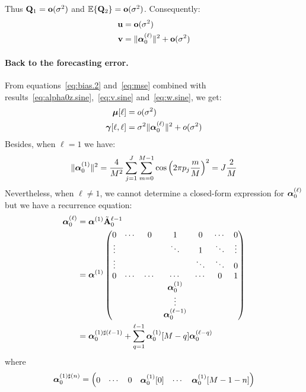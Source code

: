 Thus ${\mathbf Q}_1={\mathbf o}(\sigma^2)$ and ${\mathbb E}\{{\mathbf Q}_2\}={\mathbf o}(\sigma^2)$. Consequently:
\begin{align}
\label{eq:v.sine}
{\mathbf u} &= {\mathbf o}(\sigma^2) \\
\label{eq:w.sine}
{\mathbf v} &= \|\boldsymbol{\alpha}_0^{(\ell)}\|^2+{\mathbf o}(\sigma^2)
\end{align}

\paragraph{Back to the forecasting error.}
From equations~\eqref{eq:bias.2} and~\eqref{eq:mse} combined with results~\eqref{eq:alpha0z.sine},~\eqref{eq:v.sine} and~\eqref{eq:w.sine}, we get:
\begin{align*}
\boldsymbol{\mu}[\ell] &= o(\sigma^2) \\
\boldsymbol{\gamma}[\ell,\ell] &= \sigma^2\|\boldsymbol{\alpha}_0^{(\ell)}\|^2 + o(\sigma^2)
\end{align*}
Besides, when $\ell=1$ we have:
\begin{equation*}
\|\boldsymbol{\alpha}_0^{(1)}\|^2 = \dfrac4{M^2}\sum_{j=1}^J\sum_{m=0}^{M-1}\cos\left(2\pi p_j\dfrac{m}{M}\right)^2 = J\dfrac2M
\end{equation*}
Nevertheless, when $\ell\neq 1$, we cannot determine a closed-form expression for $\boldsymbol{\alpha}_0^{(\ell)}$ but we have a recurrence equation:
\begin{align*}
\boldsymbol{\alpha}_0^{(\ell)} &= \boldsymbol{\alpha}^{(1)}\tilde{{\mathbf A}}_0^{\ell-1} \\
&= \boldsymbol{\alpha}^{(1)}
\begin{pmatrix}
0       & \cdots & 0      & 1      & 0      & \cdots & 0 \\
\vdots  &        &        & \ddots & 1      & \ddots & \vdots \\
\vdots  &        &        &        & \ddots & \ddots & 0 \\
0       & \cdots & \cdots & \cdots & \cdots &    0   & 1 \\
        &        &        & \boldsymbol{\alpha}_0^{(1)} &        &        &   \\
        &        &        & \vdots &        &        &   \\
        &        &        & \boldsymbol{\alpha}_0^{(\ell-1)} &        &        &   
\end{pmatrix} \\
&=\boldsymbol{\alpha}_0^{(1)\sharp(\ell -1)} + \sum_{q=1}^{\ell-1}\boldsymbol{\alpha}_0^{(1)}[M-q]\boldsymbol{\alpha}_0^{(\ell-q)}
\end{align*}
where
\begin{equation*}
\boldsymbol{\alpha}_0^{(1)\sharp(n)} = 
\begin{pmatrix}
0 & \cdots & 0 & \boldsymbol{\alpha}_0^{(1)}[0] & \cdots & \boldsymbol{\alpha}_0^{(1)}[M-1-n]
\end{pmatrix}
\end{equation*}
